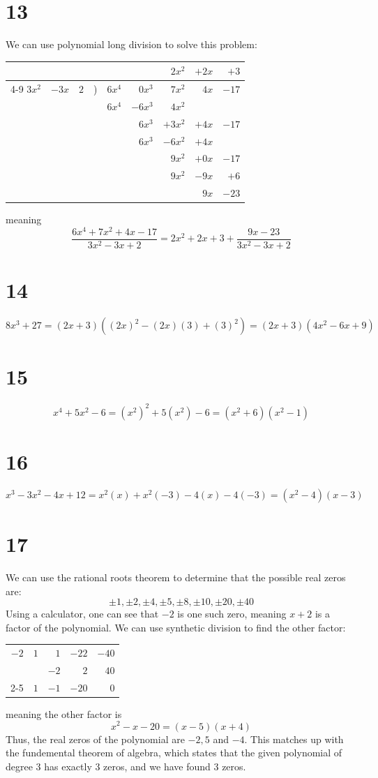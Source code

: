 \documentclass{article}
\theoremstyle{definition}
\begin{document}
\section*{13}
We can use polynomial long division to solve this problem:
\begin{center} \begin{tabular}{rrrrrrrrr}
	 & 	&	&	&	&	& $2x^2$ & $+2x$ & $+3$ \\
			\cline{4-9} 
	 $3x^2$ & $-3x$ & $2$ & ) & $6x^4$ & $0x^3$ & $7x^2$ & $4x$ & $-17$ \\
	 & & & & $6x^4$ & $-6x^3$ & $4x^2$ \\
	 & & & & & $6x^3$ & $+3x^2$ & $+4x$ & $-17$ \\
	 & & & & & $6x^3$ & $-6x^2$ & $+4x$ \\
	 & & & & & & $9x^2$ & $+0x$ & $-17$ \\
	 & & & & & & $9x^2$ & $-9x$ & $+6$ \\
	 & & & & & & & $9x$ & $-23$
\end{tabular} \end{center}
meaning \[ \dfrac{6x^4+7x^2+4x-17}{3x^2-3x+2}=2x^2+2x+3+\frac{9x-23}{3x^2-3x+2} \]

\section*{14}
\[ 8x^3+27=(2x+3)((2x)^2-(2x)(3)+(3)^2)=(2x+3)(4x^2-6x+9) \]

\section*{15}
\[ x^4+5x^2-6=(x^2)^2+5(x^2)-6=(x^2+6)(x^2-1) \]

\section*{16}
\[ x^3-3x^2-4x+12=x^2(x)+x^2(-3)-4(x)-4(-3)=(x^2-4)(x-3) \]

\section*{17}
We can use the rational roots theorem to determine that the possible real zeros are:
\[ \pm 1,\pm 2,\pm 4,\pm 5, \pm 8, \pm 10, \pm 20, \pm 40 \] Using a calculator, one can see that $-2$ is one such zero, meaning $x+2$ is a factor 
of the polynomial. We can use synthetic division to find the other factor:
\begin{center}
\begin{tabular}{r|rrrr}
	$-2$ & $1$ & $1$ & $-22$ & $-40$ \\
	& & $-2$ & $2$ & $40$ \\
	\cmidrule{2-5}
	& $1$ & $-1$ & $-20$ & $0$ 
\end{tabular}
\end{center}
meaning the other factor is \[ x^2-x-20=(x-5)(x+4) \] Thus, the real zeros of the polynomial are $-2,5$ and $-4$. This matches up with the fundemental 
theorem of algebra, which states that the given polynomial of degree $3$ has exactly $3$ zeros, and we have found $3$ zeros.
\end{document}
